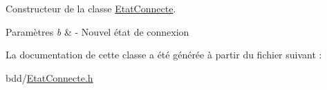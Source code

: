Constructeur de la classe \hyperlink{class_etat_connecte}{Etat\-Connecte}. 


\begin{DoxyParams}{Paramètres}
{\em b} & -\/ Nouvel état de connexion \\
\hline
\end{DoxyParams}


La documentation de cette classe a été générée à partir du fichier suivant \-:\begin{DoxyCompactItemize}
\item 
bdd/\hyperlink{_etat_connecte_8h}{Etat\-Connecte.\-h}\end{DoxyCompactItemize}
